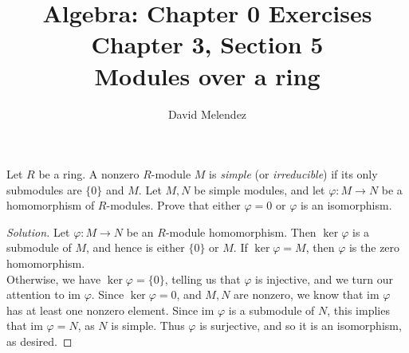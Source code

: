 \documentclass[12pt]{article}
\newenvironment{problem}[2][Problem]{\begin{trivlist}
\item[\hskip \labelsep {\bfseries #1}\hskip \labelsep {\bfseries #2.}]}{\end{trivlist}}
\newcommand{\im}{\text{im }}
\newenvironment{solution}
  {\renewcommand\qedsymbol{$\blacksquare$}\begin{proof}[Solution]}
{\end{proof}}
\theoremstyle{remark}
\begin{document}
\title{Algebra: Chapter 0 Exercises\\ \large Chapter 3, Section 5\\ 
\large Modules over a ring}
\author{David Melendez}
\maketitle

\begin{problem}{5.4}
  Let $R$ be a ring.
  A nonzero $R$-module $M$ is \textit{simple} (or \textit{irreducible})
  if its only submodules are $\{0\}$ and $M$.
  Let $M,N$ be simple modules, and let $\varphi:M\to N$ be a homomorphism
  of $R$-modules.
  Prove that either $\varphi=0$ or $\varphi$ is an isomorphism.
\end{problem}

\begin{solution}
  Let $\varphi:M\to N$ be an $R$-module homomorphism. 
  Then $\ker\varphi$ is a submodule of $M$, and hence is either $\{0\}$
  or $M$. 
  If $\ker\varphi=M$, then $\varphi$ is the zero homomorphism.\\
  \indent Otherwise, we have $\ker\varphi=\{0\}$, telling us that $\varphi$
  is injective, and we turn our attention
  to $\im\varphi$.
  Since $\ker\varphi=0$, and $M,N$ are nonzero, we know that $\im\varphi$
  has at least one nonzero element.
  Since $\im\varphi$ is a submodule of $N$, this implies that $\im\varphi=N$,
  as $N$ is simple.
  Thus $\varphi$ is surjective, and so it is an isomorphism, as desired.

\end{solution}<++>
\end{document}

